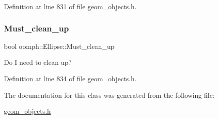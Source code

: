 Definition at line 831 of file geom\+\_\+objects.\+h.

\mbox{\label{classoomph_1_1Ellipse_ad21b2c34858b46d6bff5f25f02bbe3d9}} 
\subsubsection{\texorpdfstring{Must\+\_\+clean\+\_\+up}{Must\_clean\_up}}
{\footnotesize\ttfamily bool oomph\+::\+Ellipse\+::\+Must\+\_\+clean\+\_\+up\hspace{0.3cm}{\ttfamily [private]}}



Do I need to clean up? 



Definition at line 834 of file geom\+\_\+objects.\+h.



The documentation for this class was generated from the following file\+:\begin{DoxyCompactItemize}
\item 
\hyperlink{geom__objects_8h}{geom\+\_\+objects.\+h}\end{DoxyCompactItemize}
